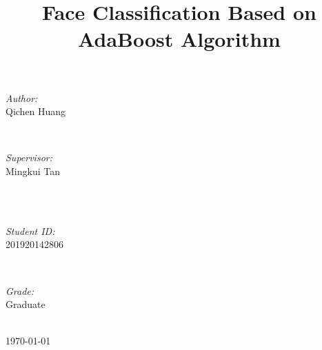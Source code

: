 \documentclass[journal, a4paper]{IEEEtran}
\begin{document}
\begin{titlepage}
\begin{minipage}{0.4\textwidth}
\begin{flushleft} \large
\emph{Author:}\\
Qichen Huang %
\end{flushleft}
\end{minipage}
~
\begin{minipage}{0.4\textwidth}
\begin{flushright} \large
\emph{Supervisor:} \\
Mingkui Tan%
\end{flushright}
\end{minipage}\\[2cm]
~
\begin{minipage}{0.4\textwidth}
\begin{flushleft} \large
\emph{Student ID:}\\
201920142806
\end{flushleft}
\end{minipage}
~
\begin{minipage}{0.4\textwidth}
\begin{flushright} \large
\emph{Grade:} \\
Graduate
\end{flushright}
\end{minipage}\\[2cm]



{\large \today}\\[2cm] %



\vfill %

\end{titlepage}

	\title{Face Classification Based on AdaBoost Algorithm}
	\maketitle
\end{document}
